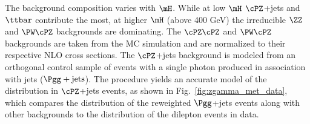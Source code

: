 The background composition varies with $\mH$. While at low $\mH$ $\cPZ$+jets and
$\ttbar$ contribute the most, at higher $\mH$ (above 400 GeV) the irreducible $\ZZ$ and $\PW\cPZ$ backgrounds are dominating.
The $\cPZ\cPZ$ and $\PW\cPZ$ backgrounds are taken from the MC simulation and are
normalized to their respective NLO cross sections. 
The $\cPZ$+jets background is modeled from an orthogonal control sample of events
with a single photon produced in association with jets ($\Pgg+\text{jets}$).
The procedure yields an accurate model of the \MET distribution in $\cPZ$+jets events,
as shown in Fig.~\ref{fig:zgamma_met_data}, which compares the
\MET distribution of the reweighted $\Pgg$+jets events along with other backgrounds to the \MET
distribution of the dilepton events in data.
